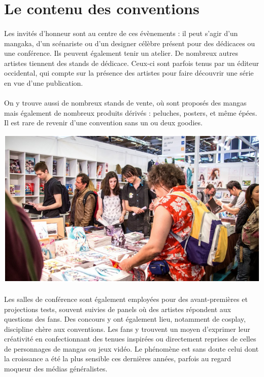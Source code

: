 \section{Le contenu des conventions}

\paragraph{} Les invités d'honneur sont au centre de ces évènements : il peut
s'agir d'un mangaka, d'un scénariste ou d'un designer célèbre présent pour des
dédicaces ou une conférence. Ils peuvent également tenir un atelier. De
nombreux autres artistes tiennent des stands de dédicace. Ceux-ci sont parfois
tenus par un éditeur occidental, qui compte sur la présence des artistes pour
faire découvrir une série en vue d'une publication.

\paragraph{} On y trouve aussi de nombreux stands de vente, où sont proposés
des mangas mais également de nombreux produits dérivés : peluches, posters, et
même épées. Il est rare de revenir d'une convention sans un ou deux goodies.

\begin{center}
	\includegraphics[scale=0.5]{boutique.png}
\end{center}

\paragraph{} Les salles de conférence sont également employées pour des
avant-premières et projections tests, souvent suivies de panels où des artistes
répondent aux questions des fans. Des concours y ont également lieu, notamment
de cosplay, discipline chère aux conventions. Les fans y trouvent un moyen
d'exprimer leur créativité en confectionnant des tenues inspirées ou
directement reprises de celles de personnages de mangas ou jeux vidéo. Le
phénomène est sans doute celui dont la croissance a été la plus sensible ces
dernières années, parfois au regard moqueur des médias généralistes.

